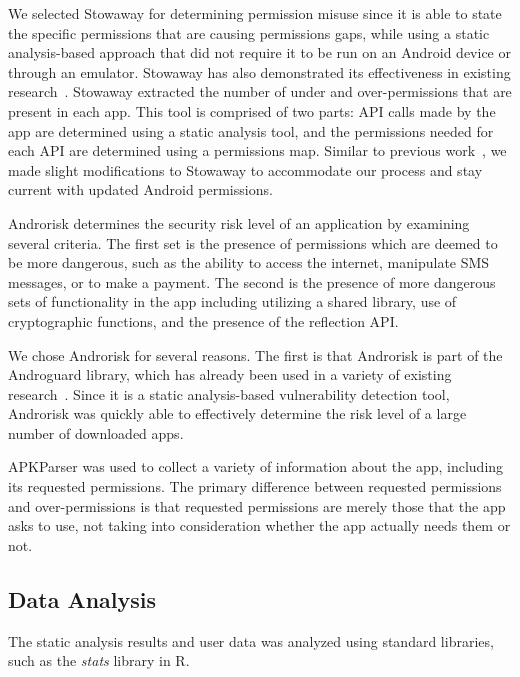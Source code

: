 \documentclass{sig-alternate-05-2015}
\begin{document}
We selected Stowaway for determining permission misuse since it is able to state the specific permissions that are causing permissions gaps, while using a static analysis-based approach that did not require it to be run on an Android device or through an emulator. Stowaway has also demonstrated its effectiveness in existing research~\cite{Stevens:2013:APU:2487085.2487093, Felt:2011:APD:2046707.2046779, Pearce:2012:APS:2414456.2414498}. Stowaway extracted the number of under and over-permissions that are present in each app. This tool is comprised of two parts: API calls made by the app are determined using a static analysis tool, and the permissions needed for each API are determined using a permissions map. Similar to previous work~\cite{Stevens:2013:APU:2487085.2487093}, we made slight modifications to Stowaway to accommodate our process and stay current with updated Android permissions.


Androrisk determines the security risk level of an application by examining several criteria. The first set is the presence of permissions which are deemed to be more dangerous, such as the ability to access the internet, manipulate SMS messages, or to make a payment. The second is the presence of more dangerous sets of functionality in the app including utilizing a shared library, use of cryptographic functions, and the presence of the reflection API.

We chose Androrisk for several reasons. The first is that Androrisk is part of the Androguard library, which has already been used in a variety of existing research~\cite{Egele:2013:ESC:2508859.2516693, Vidas:2014:AAA:2666620.2666630, Atzeni:2014:DYA:2692983.2693001}. Since it is a static analysis-based vulnerability detection tool, Androrisk was quickly able to effectively determine the risk level of a large number of downloaded apps.

APKParser was used to collect a variety of information about the app, including its requested permissions. The primary difference between requested permissions and over-permissions is that requested permissions are merely those that the app asks to use, not taking into consideration whether the app actually needs them or not.


\subsection{Data Analysis}

The static analysis results and user data was analyzed using standard libraries, such as the {\it stats} library in R.
\end{document}
